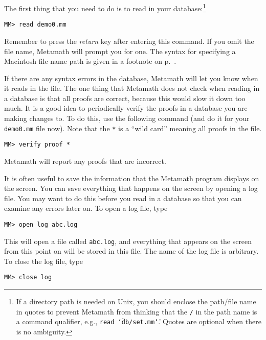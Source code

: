 The first thing that you need to do is to read in your
database:\footnote{If a directory path is
needed on Unix, you should
enclose the path/file name in quotes to prevent Metamath from thinking
that the \texttt{/} in the path name is a command qualifier, e.g.,
\texttt{read \char`\"db/set.mm\char`\"}.  Quotes are optional when there
is no ambiguity.}
\begin{verbatim}
MM> read demo0.mm
\end{verbatim}
Remember to press the {\em return} key after entering this command.  If
you omit the file name, Metamath will prompt you for one.   The syntax for
specifying a Macintosh file name path is given in a footnote on
p.~\pageref{includef}.

If there are any syntax errors in the database, Metamath will let you know
when it reads in the file.  The one thing that Metamath does not check when
reading in a database is that all proofs are correct, because this would
slow it down too much.  It is a good idea to periodically verify the proofs in
a database you are making changes to.  To do this, use the following command
(and do it for your \texttt{demo0.mm} file now).  Note that the \texttt{*} is a
``wild card'' meaning all proofs in the file.
\begin{verbatim}
MM> verify proof *
\end{verbatim}
Metamath will report any proofs that are incorrect.

It is often useful to save the information that the Metamath program displays
on the screen. You can save everything that happens on the screen by opening a
log file. You may want to do this before you read in a database so that you
can examine any errors later on.  To open a log file, type
\begin{verbatim}
MM> open log abc.log
\end{verbatim}
This will open a file called \texttt{abc.log}, and everything that appears on the
screen from this point on will be stored in this file.  The name of the log file
is arbitrary. To close the log file, type
\begin{verbatim}
MM> close log
\end{verbatim}

